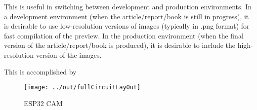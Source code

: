 \documentclass[12pt, a4, utf8]{report}        %
\begin{document}
        This is useful in switching between development and production environments. In a development environment (when the article/report/book is still in progress), it is desirable to use low-resolution versions of images (typically in .png format) for fast compilation of the preview. In the production environment (when the final version of the article/report/book is produced), it is desirable to include the high-resolution version of the images.

        This is accomplished by

        \begin{figure}[h]
            \caption{ESP32 CAM}\label{fig:figure4}
            \centering
            \texttt{[image: ../out/fullCircuitLayOut]}
        \end{figure}


    
        
\end{document}
